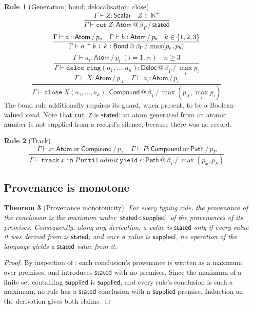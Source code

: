 \documentclass[11pt,twocolumn,a4paper]{article}
\theoremstyle{thmstyle}
\newtheorem{theorem}{Theorem}[section]
\theoremstyle{definition}
\newtheorem{rulename}[theorem]{Rule}
\theoremstyle{remark}
\newcommand{\N}{\mathbb{N}}
\newcommand{\flo}{\beta}
\newcommand{\hj}[1]{\texttt{#1}}
\newcommand{\stated}{\textsf{stated}}
\newcommand{\supplied}{\textsf{supplied}}
\begin{document}
\begin{rulename}[Generation; bond; delocalisation; close]
\label{rule:verbs}
\[
\frac{\Gamma\vdash Z:\mathsf{Scalar}\quad Z\in\N^{+}}
     {\Gamma\vdash \hj{cut}\ Z : \mathsf{Atom}\,@\,\flo_\Gamma\,/\,\stated}
\]
\[
\frac{\Gamma\vdash a:\mathsf{Atom}\,/\,p_a\quad
      \Gamma\vdash b:\mathsf{Atom}\,/\,p_b\quad k\in\{1,2,3\}}
     {\Gamma\vdash a\ \hj{\~{}}\ b\ \hj{:}\ k :
      \mathsf{Bond}\,@\,\flo_\Gamma\,/\,\max(p_a,p_b)}
\]
\[
\frac{\Gamma\vdash a_i:\mathsf{Atom}\,/\,p_i\ (i=1..n)\quad n\ge3}
     {\Gamma\vdash \hj{deloc\ ring}(a_1,\dots,a_n) :
      \mathsf{Deloc}\,@\,\flo_\Gamma\,/\,\max_i p_i}
\]
\[
\frac{\Gamma\vdash X:\mathsf{Atom}\,/\,p_X\quad
      \Gamma\vdash a_i:\mathsf{Atom}\,/\,p_i}
     {\Gamma\vdash \hj{close}\ X(a_1,\dots,a_k) :
      \mathsf{Compound}\,@\,\flo_\Gamma\,/\,\max(p_X,\max_i p_i)}
\]
The bond rule additionally requires its guard, when present, to be a
Boolean-valued \textit{cond}. Note that \hj{cut Z} is $\stated$: an atom
generated from an atomic number is not supplied from a record's silence,
because there was no record.
\end{rulename}

\begin{rulename}[Track]
\label{rule:track}
\[
\frac{\Gamma\vdash x:\mathsf{Atom}\ \text{or}\ \mathsf{Compound}\,/\,p_x
      \quad
      \Gamma\vdash P:\mathsf{Compound}\ \text{or}\ \mathsf{Path}\,/\,p_P}
     {\Gamma\vdash \hj{track}\ x\ \hj{in}\ P\ \hj{until}\ \textit{admit}\ \hj{yield}\ r
      : \mathsf{Path}\,@\,\flo_\Gamma\,/\,\max(p_x,p_P)}
\]
\end{rulename}

\subsection{Provenance is monotone}

\begin{theorem}[Provenance monotonicity]
\label{thm:prov-monotone}
For every typing rule, the provenance of the conclusion is the maximum
under $\stated<\supplied$ of the provenances of its premises.
Consequently, along any derivation: a value is $\stated$ only if every
value it was derived from is $\stated$; and once a value is $\supplied$,
no operation of the language yields a $\stated$ value from it.
\end{theorem}

\begin{proof}
By inspection of : each
conclusion's provenance is written as a maximum over premises, and
 introduces $\stated$ with no premises. Since the
maximum of a finite set containing $\supplied$ is $\supplied$, and every
rule's conclusion is such a maximum, no rule has a $\stated$ conclusion
with a $\supplied$ premise. Induction on the derivation gives both
claims.
\end{proof}
\end{document}
